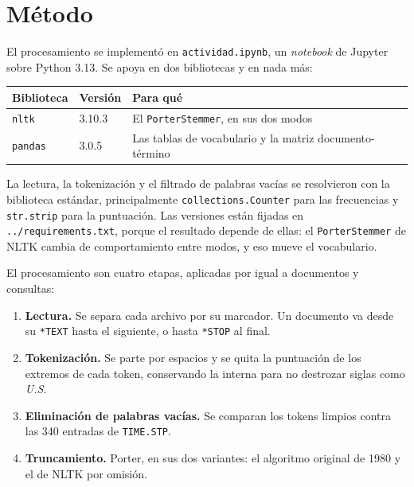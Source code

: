 \documentclass[11pt,letterpaper]{article}
\begin{document}
\section{Método}

El procesamiento se implementó en \texttt{actividad.ipynb}, un
\emph{notebook} de Jupyter sobre Python 3.13. Se apoya en dos
bibliotecas y en nada más:

\begin{center}
\begin{tabular}{lll}
    \toprule
    \textbf{Biblioteca} & \textbf{Versión} & \textbf{Para qué} \\
    \midrule
    \texttt{nltk}   & 3.10.3 & El \texttt{PorterStemmer}, en sus dos
                                modos \\
    \texttt{pandas} & 3.0.5  & Las tablas de vocabulario y la matriz
                                documento-término \\
    \bottomrule
\end{tabular}
\end{center}

La lectura, la tokenización y el filtrado de palabras vacías se
resolvieron con la biblioteca estándar, principalmente
\texttt{collections.Counter} para las frecuencias y
\texttt{str.strip} para la puntuación. Las versiones están fijadas en
\texttt{../requirements.txt}, porque el resultado depende de ellas: el
\texttt{PorterStemmer} de NLTK cambia de comportamiento entre modos, y
eso mueve el vocabulario.

El procesamiento son cuatro etapas, aplicadas por igual a documentos y
consultas:

\begin{enumerate}[itemsep=0.15em]
    \item \textbf{Lectura.} Se separa cada archivo por su marcador. Un
          documento va desde su \texttt{*TEXT} hasta el siguiente, o
          hasta \texttt{*STOP} al final.
    \item \textbf{Tokenización.} Se parte por espacios y se quita la
          puntuación de los extremos de cada token, conservando la
          interna para no destrozar siglas como \emph{U.S}.
    \item \textbf{Eliminación de palabras vacías.} Se comparan los
          tokens limpios contra las 340 entradas de
          \texttt{TIME.STP}.
    \item \textbf{Truncamiento.} Porter, en sus dos variantes: el
          algoritmo original de 1980 y el de NLTK por omisión.
\end{enumerate}
\end{document}
